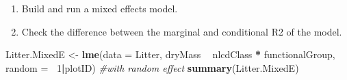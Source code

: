 \documentclass[]{article}
\newenvironment{Shaded}{\begin{snugshade}}{\end{snugshade}}
\newcommand{\CommentTok}[1]{\textcolor[rgb]{0.56,0.35,0.01}{\textit{#1}}}
\newcommand{\DataTypeTok}[1]{\textcolor[rgb]{0.13,0.29,0.53}{#1}}
\newcommand{\DecValTok}[1]{\textcolor[rgb]{0.00,0.00,0.81}{#1}}
\newcommand{\KeywordTok}[1]{\textcolor[rgb]{0.13,0.29,0.53}{\textbf{#1}}}
\newcommand{\NormalTok}[1]{#1}
\newcommand{\OperatorTok}[1]{\textcolor[rgb]{0.81,0.36,0.00}{\textbf{#1}}}
\newcommand{\StringTok}[1]{\textcolor[rgb]{0.31,0.60,0.02}{#1}}
\providecommand{\tightlist}{%
  \setlength{\itemsep}{0pt}\setlength{\parskip}{0pt}}
\begin{document}
\begin{enumerate}
\def\labelenumi{\alph{enumi}.}
\tightlist
\item
  Build and run a mixed effects model.
\item
  Check the difference between the marginal and conditional R2 of the
  model.
\end{enumerate}

\begin{Shaded}
\begin{Highlighting}[]
\NormalTok{Litter.MixedE <-}\StringTok{ }\KeywordTok{lme}\NormalTok{(}\DataTypeTok{data =}\NormalTok{ Litter,}
\NormalTok{                  dryMass }\OperatorTok{~}\StringTok{ }\NormalTok{nlcdClass }\OperatorTok{*}\StringTok{ }\NormalTok{functionalGroup, }
                  \DataTypeTok{random =} \OperatorTok{~}\DecValTok{1}\OperatorTok{|}\NormalTok{plotID) }\CommentTok{#with random effect}
\KeywordTok{summary}\NormalTok{(Litter.MixedE)}
\end{Highlighting}
\end{Shaded}
\end{document}
